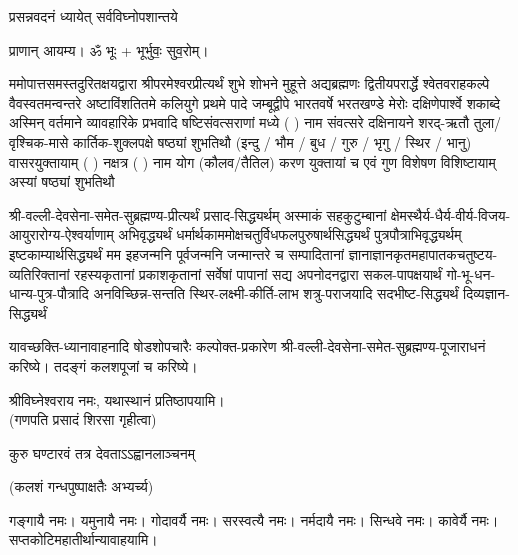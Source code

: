 
\setlength{\parindent}{0pt}




{प्रसन्नवदनं ध्यायेत् सर्वविघ्नोपशान्तये}

प्राणान् आयम्य। ॐ भूः + भूर्भुवः॒ सुव॒रोम्।



ममोपात्तसमस्तदुरितक्षयद्वारा श्रीपरमेश्वरप्रीत्यर्थं शुभे शोभने मुहूत्ते अद्यब्रह्मणः
द्वितीयपरार्द्धे श्वेतवराहकल्पे वैवस्वतमन्वन्तरे अष्टाविंशतितमे कलियुगे प्रथमे पादे
जम्बूद्वीपे भारतवर्षे भरतखण्डे मेरोः दक्षिणेपार्श्वे शकाब्दे अस्मिन् वर्तमाने व्यावहारिके
 प्रभवादि षष्टिसंवत्सराणां मध्ये (  ) नाम संवत्सरे दक्षिनायने 
शरद्-ऋतौ  तुला/वृश्चिक-मासे कार्तिक-शुक्लपक्षे षष्ठ्यां शुभतिथौ
(इन्दु / भौम / बुध / गुरु / भृगु / स्थिर / भानु) वासरयुक्तायाम्
(  ) नक्षत्र (  ) नाम  योग  (कौलव/तैतिल) करण युक्तायां च एवं गुण विशेषण विशिष्टायाम् अस्यां षष्ठ्यां शुभतिथौ 

श्री-वल्ली-देवसेना-समेत-सुब्रह्मण्य-प्रीत्यर्थं प्रसाद-सिद्ध्यर्थम्
अस्माकं सहकुटुम्बानां क्षेमस्थैर्य-धैर्य-वीर्य-विजय-आयुरारोग्य-ऐश्वर्याणाम् अभिवृद्ध्यर्थं
धर्मार्थ\-काम\-मोक्ष\-चतुर्विध\-फल\-पुरुषार्थ\-सिद्ध्यर्थं पुत्र\-पौत्रा\-भि\-वृद्ध्यर्थम् इष्ट\-काम्यार्थ\-सिद्ध्यर्थं
मम इहजन्मनि पूर्वजन्मनि जन्मान्तरे च सम्पादितानां ज्ञानाज्ञानकृतमहा\-पातकचतुष्टय-व्यतिरिक्तानां रहस्यकृतानां प्रकाशकृतानां सर्वेषां पापानां सद्य अपनोदनद्वारा 
सकल-पाप\-क्षयार्थं गो-भू-धन-धान्य-पुत्र-पौत्रादि अनविच्छिन्न-सन्तति स्थिर-लक्ष्मी-कीर्ति-लाभ शत्रु-पराजयादि सदभीष्ट-सिद्ध्यर्थं दिव्यज्ञान-सिद्ध्यर्थं

यावच्छक्ति-ध्यानावाहनादि षोडशोपचारैः कल्पोक्त-प्रकारेण श्री-वल्ली-देवसेना-समेत-सुब्रह्मण्य-पूजाराधनं करिष्ये। तदङ्गं कलश\-पूजां च करिष्ये।


श्रीविघ्नेश्वराय नमः, यथास्थानं प्रतिष्ठापयामि।\\
(गणपति प्रसादं शिरसा गृहीत्वा)


{कुरु घण्टारवं तत्र देवताऽऽह्वानलाञ्चनम्}


(कलशं गन्धपुष्पाक्षतैः अभ्यर्च्य)

गङ्गायै नमः। यमुनायै नमः। गोदावर्यै नमः। सरस्वत्यै नमः। नर्मदायै नमः। सिन्धवे नमः। कावेर्यै नमः।\\
सप्तकोटिमहातीर्थान्यावाहयामि। \\

